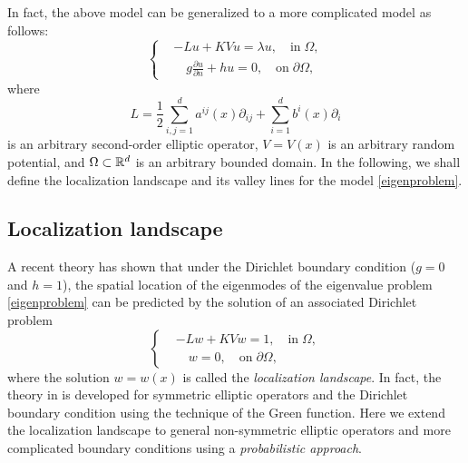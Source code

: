 \documentclass[a4paper,11pt]{article}
\begin{document}
In fact, the above model can be generalized to a more complicated model as follows:
\begin{equation}\label{eigenproblem}
\left\{
\begin{split}
& - L u + K V u = \lambda u, \quad\textrm{in}\;\Omega, \\
& \quad g \frac{\partial u}{\partial n} + h u = 0, \quad \textrm{on} \; \partial \Omega,
\end{split}
\right.
\end{equation}
where
\begin{equation}\label{operator}
L = \frac{1}{2} \sum_{i,j=1}^{d} a^{ij}(x) \partial_{ij} + \sum_{i=1}^{d} b^i(x) \partial_i
\end{equation}
is an arbitrary second-order elliptic operator, $V = V(x)$ is an arbitrary random potential, and $\Omega \subset \mathbb{R}^d$ is an arbitrary bounded domain. In the following, we shall define the localization landscape and its valley lines for the model \eqref{eigenproblem}.

\subsection{Localization landscape}
A recent theory \cite{filoche2012universal} has shown that under the Dirichlet boundary condition ($g = 0$ and $h = 1$), the spatial location of the eigenmodes of the eigenvalue problem \eqref{eigenproblem} can be predicted by the solution of an associated Dirichlet problem
\begin{equation}\label{landDirichlet}
\left\{
\begin{split}
& -L w + K V w = 1, \quad \textrm{in} \; \Omega, \\
& \quad w = 0, \quad \textrm{on} \; \partial \Omega,
\end{split}
\right.
\end{equation}
where the solution $w = w(x)$ is called the \emph{localization landscape}. In fact, the theory in \cite{filoche2012universal} is developed for symmetric elliptic operators and the Dirichlet boundary condition using the technique of the Green function. Here we extend the localization landscape to general non-symmetric elliptic operators and more complicated boundary conditions using a \emph{probabilistic approach}.
\end{document}
